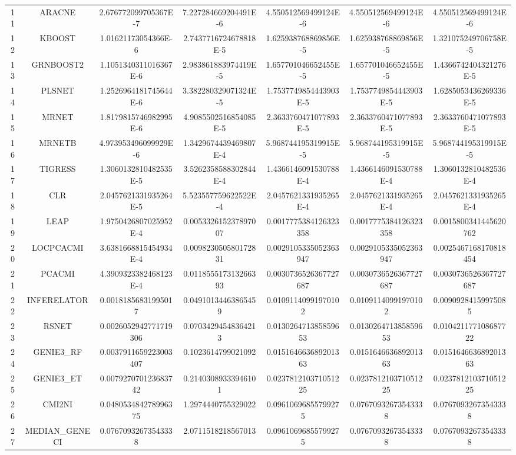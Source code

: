 \documentclass[a4paper,10pt]{article}
\begin{document}
\begin{landscape}
\begin{table}[!htp]
\begin{tabular}{ccccccc}
11&ARACNE&2.676772099705367E-7&7.227284669204491E-6&4.550512569499124E-6&4.550512569499124E-6&4.550512569499124E-6\\
12&KBOOST&1.01621173054366E-6&2.7437716724678818E-5&1.625938768869856E-5&1.625938768869856E-5&1.321075249706758E-5\\
13&GRNBOOST2&1.1051340311016367E-6&2.983861883974419E-5&1.657701046652455E-5&1.657701046652455E-5&1.4366742404321276E-5\\
14&PLSNET&1.2526964181745644E-6&3.382280329071324E-5&1.7537749854443903E-5&1.7537749854443903E-5&1.6285053436269336E-5\\
15&MRNET&1.8179815746982995E-6&4.9085502516854085E-5&2.3633760471077893E-5&2.3633760471077893E-5&2.3633760471077893E-5\\
16&MRNETB&4.973953496099929E-6&1.3429674439469807E-4&5.968744195319915E-5&5.968744195319915E-5&5.968744195319915E-5\\
17&TIGRESS&1.3060132810482535E-5&3.5262358588302844E-4&1.4366146091530788E-4&1.4366146091530788E-4&1.3060132810482536E-4\\
18&CLR&2.0457621331935264E-5&5.523557759622522E-4&2.0457621331935265E-4&2.0457621331935265E-4&2.0457621331935265E-4\\
19&LEAP&1.9750426807025952E-4&0.005332615237897007&0.0017775384126323358&0.0017775384126323358&0.0015800341445620762\\
20&LOCPCACMI&3.6381668815454934E-4&0.009823050580172831&0.0029105335052363947&0.0029105335052363947&0.0025467168170818454\\
21&PCACMI&4.3909323382468123E-4&0.011855517313266393&0.0030736526367727687&0.0030736526367727687&0.0030736526367727687\\
22&INFERELATOR&0.00181856831995017&0.04910134463865459&0.01091140991970102&0.01091140991970102&0.00909284159975085\\
23&RSNET&0.0026052942771719306&0.07034294548364213&0.013026471385859653&0.013026471385859653&0.010421177108687722\\
24&GENIE3_RF&0.0037911659223003407&0.1023614799021092&0.015164663689201363&0.015164663689201363&0.015164663689201363\\
25&GENIE3_ET&0.007927070123683742&0.21403089333946101&0.023781210371051225&0.023781210371051225&0.023781210371051225\\
26&CMI2NI&0.048053484278996375&1.2974440755329022&0.09610696855799275&0.07670932673543338&0.07670932673543338\\
27&MEDIAN_GENECI&0.07670932673543338&2.0711518218567013&0.09610696855799275&0.07670932673543338&0.07670932673543338\\
\hline
\end{tabular}
\end{table}


\end{landscape}
\end{document}

